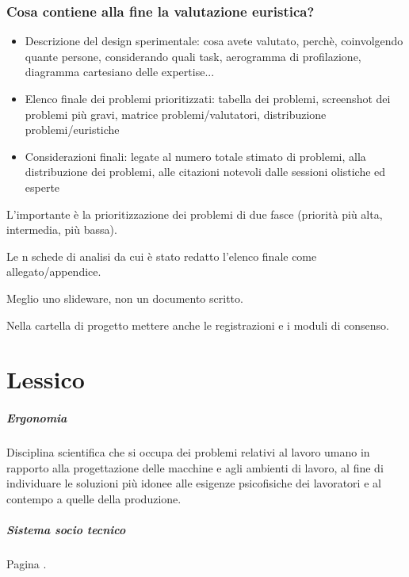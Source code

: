\documentclass[11pt,a4paper]{book}
\begin{document}
\subsection{Cosa contiene alla fine la valutazione euristica?}
\begin{itemize}
	\item Descrizione del design sperimentale: cosa avete valutato, perchè, coinvolgendo quante persone, considerando quali task, aerogramma di profilazione, diagramma cartesiano delle expertise...
	\item Elenco finale dei problemi prioritizzati: tabella dei problemi, screenshot dei problemi più gravi, matrice problemi/valutatori, distribuzione problemi/euristiche
	\item Considerazioni finali: legate al numero totale stimato di problemi, alla distribuzione dei problemi, alle citazioni notevoli dalle sessioni olistiche ed esperte
\end{itemize}

L'importante è la prioritizzazione dei problemi di due fasce (priorità più alta, intermedia, più bassa).

Le n schede di analisi da cui è stato redatto l'elenco finale come allegato/appendice.

Meglio uno slideware, non un documento scritto.

Nella cartella di progetto mettere anche le registrazioni e i moduli di consenso.



\chapter{Lessico}
\paragraph{Ergonomia}
Disciplina scientifica che si occupa dei problemi relativi al lavoro umano in rapporto alla progettazione delle macchine e agli ambienti di lavoro, al fine di individuare le soluzioni più idonee alle esigenze psicofisiche dei lavoratori e al contempo a quelle della produzione.

\paragraph{Sistema socio tecnico}
Pagina \pageref{par: sistema sociotecnico}.
\end{document}
